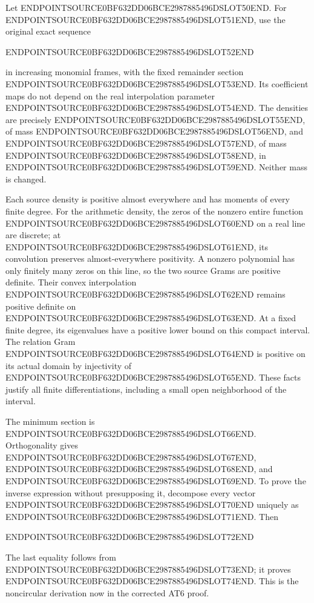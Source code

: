 Let ENDPOINTSOURCE0BF632DD06BCE2987885496DSLOT50END. For ENDPOINTSOURCE0BF632DD06BCE2987885496DSLOT51END, use the original exact sequence

ENDPOINTSOURCE0BF632DD06BCE2987885496DSLOT52END

in increasing monomial frames, with the fixed remainder section ENDPOINTSOURCE0BF632DD06BCE2987885496DSLOT53END. Its coefficient maps do not depend on the real interpolation parameter ENDPOINTSOURCE0BF632DD06BCE2987885496DSLOT54END. The densities are precisely ENDPOINTSOURCE0BF632DD06BCE2987885496DSLOT55END, of mass ENDPOINTSOURCE0BF632DD06BCE2987885496DSLOT56END, and ENDPOINTSOURCE0BF632DD06BCE2987885496DSLOT57END, of mass ENDPOINTSOURCE0BF632DD06BCE2987885496DSLOT58END, in ENDPOINTSOURCE0BF632DD06BCE2987885496DSLOT59END. Neither mass is changed.

Each source density is positive almost everywhere and has moments of every finite degree. For the arithmetic density, the zeros of the nonzero entire function ENDPOINTSOURCE0BF632DD06BCE2987885496DSLOT60END on a real line are discrete; at ENDPOINTSOURCE0BF632DD06BCE2987885496DSLOT61END, its convolution preserves almost-everywhere positivity. A nonzero polynomial has only finitely many zeros on this line, so the two source Grams are positive definite. Their convex interpolation ENDPOINTSOURCE0BF632DD06BCE2987885496DSLOT62END remains positive definite on ENDPOINTSOURCE0BF632DD06BCE2987885496DSLOT63END. At a fixed finite degree, its eigenvalues have a positive lower bound on this compact interval. The relation Gram ENDPOINTSOURCE0BF632DD06BCE2987885496DSLOT64END is positive on its actual domain by injectivity of ENDPOINTSOURCE0BF632DD06BCE2987885496DSLOT65END. These facts justify all finite differentiations, including a small open neighborhood of the interval.

The minimum section is ENDPOINTSOURCE0BF632DD06BCE2987885496DSLOT66END. Orthogonality gives ENDPOINTSOURCE0BF632DD06BCE2987885496DSLOT67END, ENDPOINTSOURCE0BF632DD06BCE2987885496DSLOT68END, and ENDPOINTSOURCE0BF632DD06BCE2987885496DSLOT69END. To prove the inverse expression without presupposing it, decompose every vector ENDPOINTSOURCE0BF632DD06BCE2987885496DSLOT70END uniquely as ENDPOINTSOURCE0BF632DD06BCE2987885496DSLOT71END. Then

ENDPOINTSOURCE0BF632DD06BCE2987885496DSLOT72END

The last equality follows from ENDPOINTSOURCE0BF632DD06BCE2987885496DSLOT73END; it proves ENDPOINTSOURCE0BF632DD06BCE2987885496DSLOT74END. This is the noncircular derivation now in the corrected AT6 proof.

